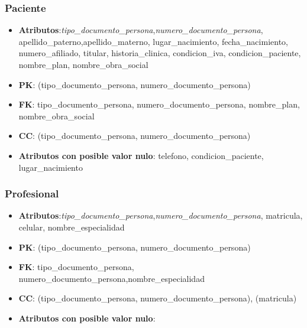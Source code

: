 \documentclass[a4paper,11pt]{article}
\begin{document}
\subsubsection{\textbf{Paciente}}

\begin{itemize}

\item 
\textbf{Atributos}:\emph{tipo\_documento\_persona},\emph{numero\_documento\_persona}, apellido\_paterno,apellido\_materno, lugar\_nacimiento, fecha\_nacimiento,  numero\_afiliado, titular, historia\_clinica, condicion\_iva, condicion\_paciente, nombre\_plan, nombre\_obra\_social

\item 
\textbf{PK}: (tipo\_documento\_persona, numero\_documento\_persona)

\item
\textbf{FK}:  tipo\_documento\_persona, numero\_documento\_persona, nombre\_plan, nombre\_obra\_social

\item 
\textbf{CC}: (tipo\_documento\_persona, numero\_documento\_persona)

\item 
\textbf{Atributos con posible valor nulo}: telefono, condicion\_paciente, lugar\_nacimiento

\end{itemize}
\subsubsection{\textbf{Profesional}}

\begin{itemize}

\item 
\textbf{Atributos}:\emph{tipo\_documento\_persona},\emph{numero\_documento\_persona}, matricula, celular,  nombre\_especialidad

\item 
\textbf{PK}: (tipo\_documento\_persona, numero\_documento\_persona)

\item
\textbf{FK}: tipo\_documento\_persona, numero\_documento\_persona,nombre\_especialidad

\item 
\textbf{CC}: (tipo\_documento\_persona, numero\_documento\_persona), (matricula)

\item 
\textbf{Atributos con posible valor nulo}:

\end{itemize}
\end{document}
